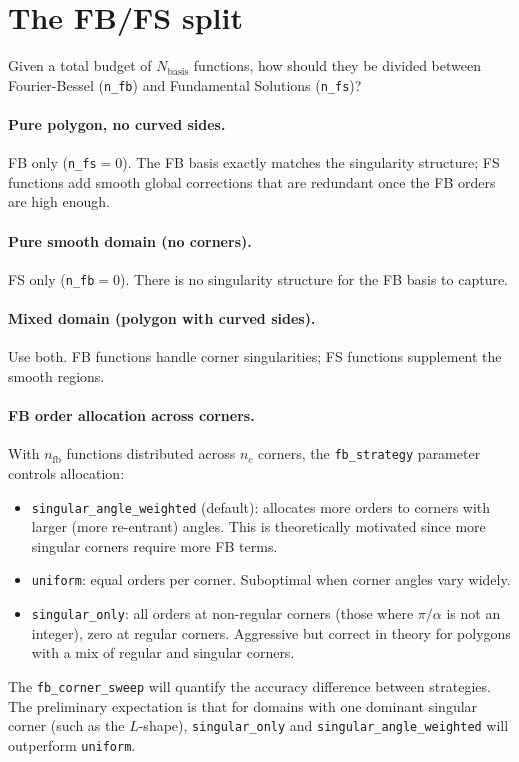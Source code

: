 \documentclass[11pt]{article}
\newcommand{\Nbasis}{N_{\mathrm{basis}}}
\begin{document}
\section{The FB/FS split}

Given a total budget of $\Nbasis$ functions, how should they be divided between
Fourier-Bessel (\texttt{n\_fb}) and Fundamental Solutions (\texttt{n\_fs})?

\paragraph{Pure polygon, no curved sides.}
FB only (\texttt{n\_fs}$=0$).  The FB basis exactly matches the singularity
structure; FS functions add smooth global corrections that are redundant once the
FB orders are high enough.

\paragraph{Pure smooth domain (no corners).}
FS only (\texttt{n\_fb}$=0$).  There is no singularity structure for the FB
basis to capture.

\paragraph{Mixed domain (polygon with curved sides).}
Use both.  FB functions handle corner singularities; FS functions supplement the
smooth regions.

\paragraph{FB order allocation across corners.}
With $n_{\mathrm{fb}}$ functions distributed across $n_c$ corners, the
\texttt{fb\_strategy} parameter controls allocation:
\begin{itemize}
  \item \texttt{singular\_angle\_weighted} (default): allocates more orders to
    corners with larger (more re-entrant) angles.  This is theoretically
    motivated since more singular corners require more FB terms.
  \item \texttt{uniform}: equal orders per corner.  Suboptimal when corner
    angles vary widely.
  \item \texttt{singular\_only}: all orders at non-regular corners (those where
    $\pi/\alpha$ is not an integer), zero at regular corners.  Aggressive but
    correct in theory for polygons with a mix of regular and singular corners.
\end{itemize}
The \texttt{fb\_corner\_sweep} will quantify the accuracy difference between
strategies.  The preliminary expectation is that for domains with one dominant
singular corner (such as the $L$-shape), \texttt{singular\_only} and
\texttt{singular\_angle\_weighted} will outperform \texttt{uniform}.
\end{document}
